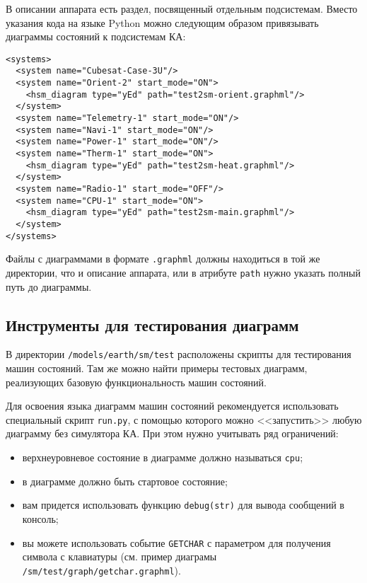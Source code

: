 \documentclass[12pt,a4paper]{article}
\begin{document}
В описании аппарата есть раздел, посвященный отдельным подсистемам. Вместо указания кода
на языке Python можно следующим образом привязывать диаграммы состояний к подсистемам КА:

\begin{verbatim}
<systems>
  <system name="Cubesat-Case-3U"/>
  <system name="Orient-2" start_mode="ON">
    <hsm_diagram type="yEd" path="test2sm-orient.graphml"/>
  </system>
  <system name="Telemetry-1" start_mode="ON"/>
  <system name="Navi-1" start_mode="ON"/>
  <system name="Power-1" start_mode="ON"/>
  <system name="Therm-1" start_mode="ON">
    <hsm_diagram type="yEd" path="test2sm-heat.graphml"/>
  </system>
  <system name="Radio-1" start_mode="OFF"/>
  <system name="CPU-1" start_mode="ON">
    <hsm_diagram type="yEd" path="test2sm-main.graphml"/>
  </system>
</systems>
\end{verbatim}

Файлы с диаграммами в формате \verb'.graphml' должны находиться в той же директории, что и
описание аппарата, или в атрибуте \verb'path' нужно указать полный путь до диаграммы.

\subsection*{Инструменты для тестирования диаграмм}

В директории \verb'/models/earth/sm/test' расположены скрипты для тестирования машин
состояний. Там же можно найти примеры тестовых диаграмм, реализующих базовую
функциональность машин состояний.

Для освоения языка диаграмм машин состояний рекомендуется использовать
специальный скрипт \verb'run.py', с помощью которого можно <<запустить>> любую диаграмму
без симулятора КА. При этом нужно учитывать ряд ограничений:

\begin{itemize}
\item верхнеуровневое состояние в диаграмме должно называться \verb'cpu';
\item в диаграмме должно быть стартовое состояние;
\item вам придется использовать функцию \verb'debug(str)' для вывода сообщений в консоль;
\item вы можете использовать событие \verb'GETCHAR' с параметром для получения символа с
  клавиатуры (см. пример диаграмы \verb'/sm/test/graph/getchar.graphml').
\end{itemize}
\end{document}
